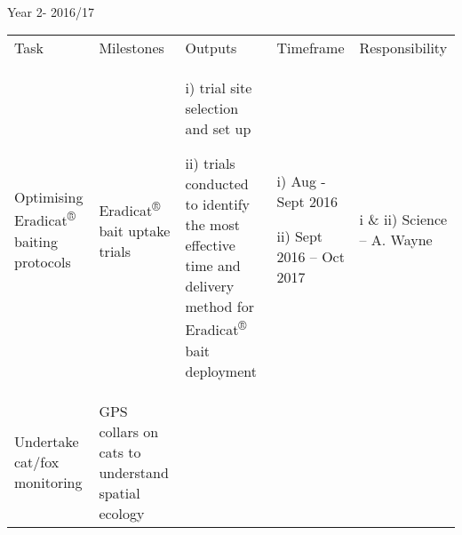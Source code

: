 \documentclass[version=last,
    paper=a4,                               %
    10pt,                                   %
    dvipsnames,
    oneside,                              %
    headings=openany,                       %
    open=any,
    BCOR=7mm,                               %
    DIV=15,     %
]{scrbook}
\begin{document}
~

Year 2- 2016/17

\begin{longtable}[c]{@{}lllll@{}}
\toprule\addlinespace
\begin{minipage}[t]{0.17\columnwidth}\raggedright
Task
\end{minipage} & \begin{minipage}[t]{0.17\columnwidth}\raggedright
Milestones
\end{minipage} & \begin{minipage}[t]{0.17\columnwidth}\raggedright
Outputs
\end{minipage} & \begin{minipage}[t]{0.17\columnwidth}\raggedright
Timeframe
\end{minipage} & \begin{minipage}[t]{0.17\columnwidth}\raggedright
Responsibility
\end{minipage}
\\\addlinespace
\begin{minipage}[t]{0.17\columnwidth}\raggedright
Optimising Eradicat\textsuperscript{®} baiting protocols
\end{minipage} & \begin{minipage}[t]{0.17\columnwidth}\raggedright
Eradicat\textsuperscript{®} bait uptake trials
\end{minipage} & \begin{minipage}[t]{0.17\columnwidth}\raggedright
i) trial site selection and set up

ii) trials conducted to identify the most effective time and delivery
method for Eradicat\textsuperscript{®} bait deployment
\end{minipage} & \begin{minipage}[t]{0.17\columnwidth}\raggedright
i) Aug - Sept 2016

ii) Sept 2016 -- Oct 2017
\end{minipage} & \begin{minipage}[t]{0.17\columnwidth}\raggedright
i \& ii) Science -- A. Wayne
\end{minipage}
\\\addlinespace
\begin{minipage}[t]{0.17\columnwidth}\raggedright
Undertake cat/fox monitoring
\end{minipage} & \begin{minipage}[t]{0.17\columnwidth}\raggedright
GPS collars on cats to understand spatial ecology~


\end{minipage}
\end{longtable}
\end{document}

